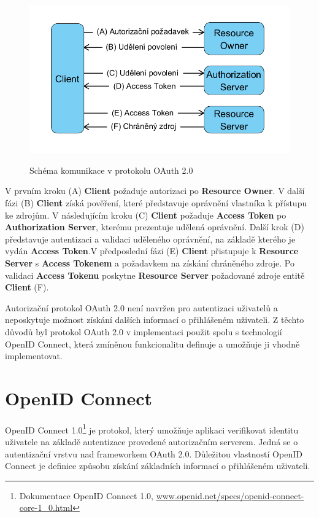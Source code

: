 \documentclass[
  printed, %
  twoside, %
  table,   %
  nolof,     %
  nolot,     %
]{fithesis3}
\begin{document}
\begin{figure}[H]
\caption{Schéma komunikace v protokolu OAuth 2.0}
\centering
\includegraphics[width=12.8cm]{pics/diplomkaOauth} 
\label{fig:oauth}
\end{figure}
\par 

V prvním kroku (A) \textbf{Client} požaduje autorizaci po \textbf{Resource Owner}. V další fázi (B) \textbf{Client} získá pověření, které představuje oprávnění vlastníka k přístupu ke zdrojům. V následujícím kroku (C) \textbf{Client} požaduje \textbf{Access Token} po \textbf{Authorization Server}, kterému prezentuje udělená oprávnění. Další krok (D) představuje autentizaci a validaci uděleného oprávnění, na základě kterého je vydán \textbf{Access Token}.\break V předposlední fázi (E) \textbf{Client} přistupuje k \textbf{Resource Server} s \textbf{Access Tokenem} a požadavkem na získání chráněného zdroje. Po validaci \textbf{Access Tokenu} poskytne \textbf{Resource Server} požadované zdroje entitě \textbf{Client} (F). \par 

Autorizační protokol OAuth 2.0 není navržen pro autentizaci uživatelů a neposkytuje možnost získání dalších informací o přihlášeném uživateli. Z těchto důvodů byl protokol OAuth 2.0 v implementaci použit spolu s technologií OpenID Connect, která zmíněnou funkcionalitu definuje a umožňuje ji vhodně implementovat. 

\section{OpenID Connect}
\label{sec:oidc}
OpenID Connect 1.0\footnote{Dokumentace OpenID Connect 1.0, \url{www.openid.net/specs/openid-connect-core-1_0.html}} je protokol, který umožňuje aplikaci verifikovat identitu uživatele na základě autentizace provedené autorizačním serverem. Jedná se o autentizační vrstvu nad frameworkem OAuth 2.0. Důležitou vlastností OpenID Connect je definice způsobu získání základních informací o přihlášeném uživateli. \par
\end{document}
